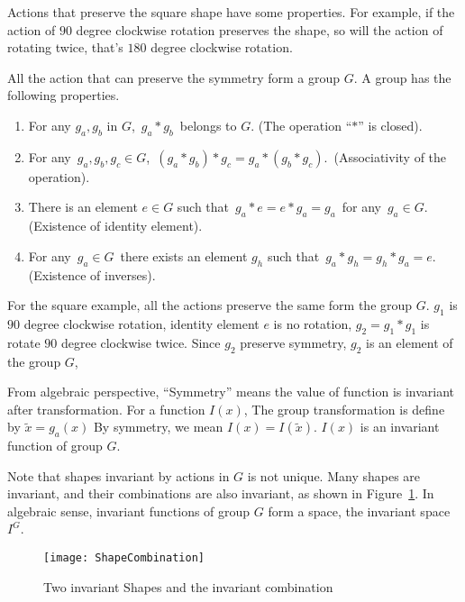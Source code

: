 Actions that preserve the square shape have some properties.
For example, if the action of $90$ degree clockwise rotation preserves the shape, so will the action of rotating twice, that's $180$ degree clockwise rotation.

All the action that can preserve the symmetry form a group $G$.
A group has the following properties.
\begin{enumerate}
\item For any $g_a,g_b$ in $G$, \,$g_a*g_b$\, belongs to $G$. (The operation ``$*$'' is closed).

\item For any \,$g_a,g_b,g_c\in G$, \,$(g_a*g_b)*g_c=g_a*(g_b*g_c)$. \,(Associativity of the operation).

\item There is an element $e\in G$ such that \,$g_a*e=e*g_a=g_a$\, for any \,$g_a\in G$. (Existence of identity element).

\item For any \,$g_a\in G$\, there exists an element $g_h$ such that \,$g_a*g_h=g_h*g_a=e$. \,(Existence of inverses).
\end{enumerate}

For the square example, all the actions preserve the same form the group $G$.
$g_1$ is  $90$ degree clockwise rotation, identity element $e$ is no rotation,
$g_2=g_1*g_1$ is rotate $90$ degree clockwise twice.
Since $g_2$ preserve symmetry, $g_2$ is an element of the group $G$, 


From algebraic perspective, ``Symmetry'' means the value of function is invariant after transformation.
For a function $I(x)$,
The group transformation is define by $\tilde{x}=g_a(x)$
By symmetry, we mean $I(x)=I(\tilde{x})$.
$I(x)$ is an invariant function of group $G$.


Note that  shapes invariant by actions in $G$ is not unique.
Many shapes are invariant, and their combinations are also invariant, as shown in Figure~\ref{fig:SymmetrySpace}. 
In algebraic sense,  invariant functions of group $G$ form a space, the invariant space $I^G$.


\begin{figure}[!htbp]
  \begin{center}
    \texttt{[image: ShapeCombination]}
    \caption{Two invariant Shapes and the invariant combination}
    \label{fig:SymmetrySpace}
\end{center}
\end{figure}

